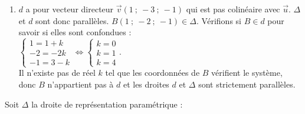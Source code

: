 \begin{colonne*exercice}
\begin{corrige}
\begin{enumerate}
  \hspace*{-5mm}$\begin{cases}
    x=1-t\\y=-2+3t\\z=-1+t\\x=1+k\\y=-2k\\z=3-k \end{cases}\hspace{-4mm}\Leftrightarrow \begin{cases}
    1+k=1-t\\-2k=-2+3t\\3-k=-1+t\\x=1+k\\y=-2k\\z=3-k \end{cases}\hspace{-4mm}\Leftrightarrow
  \begin{cases} k=-t\\t=2\\3=-1
    !!!\\x=1+k\\y=-2k\\z=3-k \end{cases}$\\
  Le système n'admet pas de solution et les droites $d$ et $\Delta$
  sont donc non coplanaires.
\item $d$ a pour vecteur directeur
  $\overrightarrow{v}(1\ ;\ -3\ ;\ -1)$ qui est pas colinéaire avec
  $\overrightarrow{u}$. $\Delta$ et $d$ sont donc parallèles.
  $B(1\ ;\ -2\ ;\ -1)\in\Delta$. Vérifions si $B\in d$ pour savoir si elles sont confondues :\\
  $\begin{cases} 1=1+k\\-2=-2k\\-1=3-k \end{cases}\Leftrightarrow \begin{cases} k=0\\k=1\\k=4 \end{cases}$.\\
  Il n'existe pas de réel $k$ tel que les coordonnées de $B$ vérifient
  le système, donc $B$ n'appartient pas à $d$ et les droites $d$ et
  $\Delta$ sont strictement parallèles.
 \end{enumerate}
\end{corrige}


\begin{exercice}
  Soit $\Delta$ la droite de représentation paramétrique :


\end{exercice}
\end{colonne*exercice}
